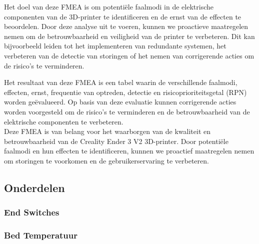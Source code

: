\documentclass{article}
\begin{document}
Het doel van deze FMEA is om potentiële faalmodi in de elektrische componenten van de 3D-printer te identificeren en de ernst van de effecten te beoordelen. Door deze analyse uit te voeren, kunnen we proactieve maatregelen nemen om de betrouwbaarheid en veiligheid van de printer te verbeteren. Dit kan bijvoorbeeld leiden tot het implementeren van redundante systemen, het verbeteren van de detectie van storingen of het nemen van corrigerende acties om de risico's te verminderen.

Het resultaat van deze FMEA is een tabel waarin de verschillende faalmodi, effecten, ernst, frequentie van optreden, detectie en risicoprioriteitsgetal (RPN) worden geëvalueerd. Op basis van deze evaluatie kunnen corrigerende acties worden voorgesteld om de risico's te verminderen en de betrouwbaarheid van de elektrische componenten te verbeteren.
\\
Deze FMEA is van belang voor het waarborgen van de kwaliteit en betrouwbaarheid van de Creality Ender 3 V2 3D-printer. Door potentiële faalmodi en hun effecten te identificeren, kunnen we proactief maatregelen nemen om storingen te voorkomen en de gebruikerservaring te verbeteren.

\subsection{Onderdelen}
\subsubsection*{End Switches}

\subsubsection*{Bed Temperatuur}
\end{document}
